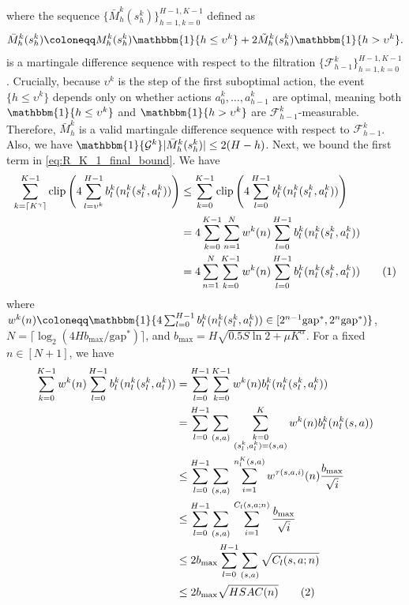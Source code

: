 \documentclass[11pt]{article}
\newcommand{\Dvsm}{M}
\newcommand{\Dvkm}{\tilde{M}}
\newcommand{\Dvm}{\bar{M}}
\newcommand{\clip}{\mathrm{clip}}
\newcommand\numberthis{\addtocounter{equation}{1}\tag{\theequation}}
\newcommand{\gapstar}{\mathrm{gap}^*}
\begin{document}
where the sequence $\{\Dvm^k_{h}(s_{h}^k)\}_{h=1,k=0}^{H-1,K-1}$ defined as 
\begin{align*}
    \Dvm_{h}^k (s_{h}^k) \coloneqq \Dvsm_{h}^k(s_{h}^k) \mathbbm{1}\{h \leq \upsilon^k\} + 2\Dvkm_{h}^k(s_{h}^k) \mathbbm{1}\{h > \upsilon^k\}.
\end{align*}
is a martingale difference sequence with respect to the filtration $\{\mathcal{F}_{h-1}^{k}\}_{h=1,k=0}^{H-1,K-1}$. Crucially, because $\upsilon^k$ is the step of the first suboptimal action, the event $\{h \leq \upsilon^k\}$ depends only on whether actions $a_0^k, \dots, a_{h-1}^k$ are optimal, meaning both $\mathbbm{1}\{h \leq \upsilon^k\}$ and $\mathbbm{1}\{h > \upsilon^k\}$ are $\mathcal{F}_{h-1}^k$-measurable. Therefore, $\Dvm_{h}^k$ is a valid martingale difference sequence with respect to $\mathcal{F}_{h-1}^k$. Also, we have $\mathbbm{1}\{\mathcal{G}^k\}  | \Dvm_{h}^k (s_{h}^k)| \leq 2(H-h)$.
Next, we bound the first term in \eqref{eq:R_K_1_final_bound}. We have
\begin{align*}
     \sum_{k=\lceil K^\gamma\rceil}^{K-1} \clip\left(4 \sum_{l=\upsilon^k}^{H-1}  b^k_l(n_l^k(s_l^k, a_l^k))\right) &\leq \sum_{k=0}^{K-1} \clip\left(4 \sum_{l=0}^{H-1}  b^k_l(n_l^k(s_l^k, a_l^k))\right) \\
     &= 4\sum_{k=0}^{K-1}\sum_{n=1}^N  w^k(n)\sum_{l=0}^{H-1}   b^k_l(n_l^k(s_l^k, a_l^k))\\
     &= 4\sum_{n=1}^N\sum_{k=0}^{K-1}  w^k(n)\sum_{l=0}^{H-1}   b^k_l(n_l^k(s_l^k, a_l^k))\numberthis\label{eq:16_further_bound}
\end{align*}
where $w^k(n) \coloneqq \mathbbm{1}\{4 \sum_{l=0}^{H-1}  b^k_l(n_l^k(s_l^k, a_l^k)) \in [2^{n-1}\gapstar,2^n\gapstar)\}$, $N = \lceil\log_2\left(4 H b_{\max}/\gapstar\right)\rceil$, and $b_{\max} = H\sqrt{0.5 S \ln 2 + \mu K^\alpha}$. For a fixed $n\in[N+1]$, we have
\begin{align*}
    \sum_{k=0}^{K-1} w^k(n) \sum_{l=0}^{H-1} b^k_l(n_l^k(s_l^k, a_l^k)) &= \sum_{l=0}^{H-1}\sum_{k=0}^{K-1} w^k(n)  b^k_l(n_l^k(s_l^k, a_l^k))\\
    &= \sum_{l=0}^{H-1} \sum_{(s,a)}\,  \sum_{\substack{k=0\\(s_l^k, a_l^k) = (s,a)} }^K w^k(n) b^k_l(n_l^k(s, a))\\
    &\leq \sum_{l=0}^{H-1} \sum_{(s,a)} \, \sum_{i=1}^{n_l^K(s, a)}  w^{\tau(s,a,i)}(n) \frac{b_{\max}}{\sqrt{i}}\\
    &\leq \sum_{l=0}^{H-1}\sum_{(s,a)} \, \sum_{i=1}^{C_l{(s,a;n)}} \frac{b_{\max}}{\sqrt{i}}\\
    &\leq 2 b_{\max}\sum_{l=0}^{H-1} \sum_{(s,a)} \sqrt{C_l{(s,a;n)}}\\
    &\leq 2 b_{\max} \sqrt{H S AC(n)} \numberthis\label{eq:C_n_sqrt}
\end{align*}
\end{document}
